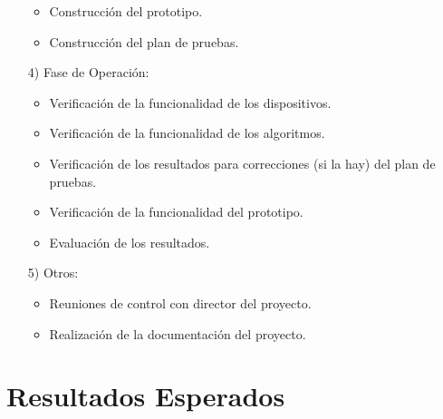 \begin{itemize}
	\begin{itemize}
	
	\item Construcción del prototipo.
	\item Construcción del plan de pruebas.
	
	\end{itemize}
	
\item[4)] Fase de Operaci\'on:

	\begin{itemize}
	
	\item Verificaci\'on de la funcionalidad de los dispositivos.
	\item Verificaci\'on de la funcionalidad de los algoritmos.
	\item Verificación de los resultados para correcciones (si la hay) del plan de pruebas.
	\item Verificaci\'on de la funcionalidad del prototipo.
	\item Evaluaci\'on de los resultados.
	
	\end{itemize}

\item[5)] Otros:

	\begin{itemize}
	
	\item Reuniones de control con director del proyecto.
	\item Realización de la documentación del proyecto.
	
	\end{itemize}
\end{itemize}		

\section{Resultados Esperados}
 
